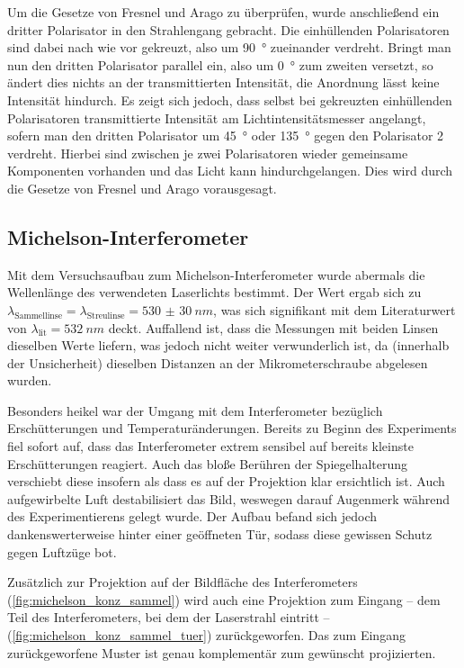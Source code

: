 \documentclass[ngerman]{scrartcl}
\begin{document}
Um die Gesetze von Fresnel und Arago zu überprüfen, wurde anschließend ein dritter Polarisator in den Strahlengang gebracht. Die einhüllenden Polarisatoren sind dabei nach wie vor gekreuzt, also um \SI{90}{\degree} zueinander verdreht. Bringt man nun den dritten Polarisator parallel ein, also um \SI{0}{\degree} zum zweiten versetzt, so ändert dies nichts an der transmittierten Intensität, die Anordnung lässt keine Intensität hindurch. Es zeigt sich jedoch, dass selbst bei gekreuzten einhüllenden Polarisatoren transmittierte Intensität am Lichtintensitätsmesser angelangt, sofern man den dritten Polarisator um \SI{45}{\degree} oder \SI{135}{\degree} gegen den Polarisator 2 verdreht. Hierbei sind zwischen je zwei Polarisatoren wieder gemeinsame Komponenten vorhanden und das Licht kann hindurchgelangen. Dies wird durch die Gesetze von Fresnel und Arago vorausgesagt.


\subsection{Michelson-Interferometer}
\label{subsec:diskussion_michelson}

Mit dem Versuchsaufbau zum Michelson-Interferometer wurde abermals die Wellenlänge des verwendeten Laserlichts bestimmt. Der Wert ergab sich zu \(\lambda_{\text{Sammellinse}} = \lambda_{\text{Streulinse}} = \SI{530(30)}{nm}\), was sich signifikant mit dem Literaturwert von $\lambda_{\text{lit}}=\SI{532}{nm}$ deckt. Auffallend ist, dass die Messungen mit beiden Linsen dieselben Werte liefern, was jedoch nicht weiter verwunderlich ist, da (innerhalb der Unsicherheit) dieselben Distanzen an der Mikrometerschraube abgelesen wurden.

Besonders heikel war der Umgang mit dem Interferometer bezüglich Erschütterungen und Temperaturänderungen. Bereits zu Beginn des Experiments fiel sofort auf, dass das Interferometer extrem sensibel auf bereits kleinste Erschütterungen reagiert. Auch das bloße Berühren der Spiegelhalterung verschiebt diese insofern als dass es auf der Projektion klar ersichtlich ist. Auch aufgewirbelte Luft destabilisiert das Bild, weswegen darauf Augenmerk während des Experimentierens gelegt wurde. Der Aufbau befand sich jedoch dankenswerterweise hinter einer geöffneten Tür, sodass diese gewissen Schutz gegen Luftzüge bot.

Zusätzlich zur Projektion auf der Bildfläche des Interferometers (\autoref{fig:michelson_konz_sammel}) wird auch eine Projektion zum Eingang -- dem Teil des Interferometers, bei dem der Laserstrahl eintritt -- (\autoref{fig:michelson_konz_sammel_tuer}) zurückgeworfen.
Das zum Eingang zurückgeworfene Muster ist genau komplementär zum gewünscht projizierten.
\end{document}
